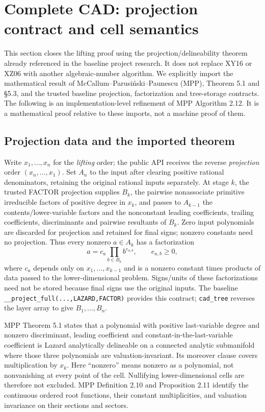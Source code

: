 \documentclass[11pt]{article}
\theoremstyle{definition}
\begin{document}
\section{Complete CAD: projection contract and cell semantics}
\label{s:cad}
This section closes the lifting proof using the projection/delineability theorem
already referenced in the baseline project research. It does not replace XY16 or
XZ06 with another algebraic-number algorithm. We explicitly import the mathematical
result of McCallum--Parusi\'nski--Paunescu (MPP)\cite{MPP}, Theorem 5.1 and
\S5.3, and the trusted baseline projection, factorization and tree-storage contracts.
The following is an implementation-level refinement of MPP Algorithm 2.12.
It is a mathematical proof relative to these imports, not a machine proof of them.

\subsection{Projection data and the imported theorem}
Write $x_1,\ldots,x_n$ for the \emph{lifting} order; the public API receives the
reverse \emph{projection} order $(x_n,\ldots,x_1)$. Set $A_n$ to the input after
clearing positive rational denominators, retaining the original rational inputs
separately. At stage $k$, the trusted FACTOR projection supplies $B_k$, the
pairwise nonassociate primitive irreducible factors of positive degree in $x_k$,
and passes to $A_{k-1}$ the contents/lower-variable factors and the nonconstant
leading coefficients, trailing coefficients, discriminants and pairwise
resultants of $B_k$. Zero input polynomials are discarded for projection and
retained for final signs; nonzero constants need no projection.
Thus every nonzero $a\in A_k$ has a factorization
\[
 a=c_a\prod_{b\in B_k}b^{e_{a,b}},\qquad e_{a,b}\ge0,
\]
where $c_a$ depends only on $x_1,\ldots,x_{k-1}$ and is a nonzero constant times
products of data passed to the lower-dimensional problem. Signs/units of these
factorizations need not be stored because final signs use the original inputs.
The baseline \texttt{\_\_project\_full(...,LAZARD,FACTOR)} provides this contract;
\texttt{cad\_tree} reverses the layer array to give $B_1,\ldots,B_n$.

MPP Theorem 5.1 states that a polynomial with positive last-variable degree and
nonzero discriminant, leading coefficient and constant-in-the-last-variable
coefficient is Lazard analytically delineable on a connected analytic submanifold
where those three polynomials are valuation-invariant. Its moreover clause covers
multiplication by $x_k$. Here ``nonzero'' means nonzero as a polynomial, not
nonvanishing at every point of the cell. Nullifying lower-dimensional cells are
therefore not excluded. MPP Definition 2.10 and Proposition 2.11 identify the
continuous ordered root functions, their constant multiplicities, and valuation
invariance on their sections and sectors.
\end{document}
